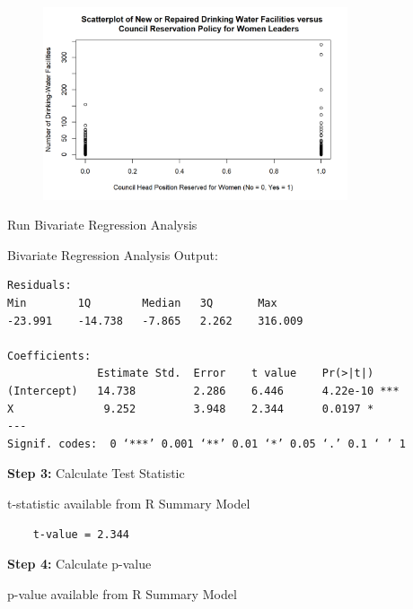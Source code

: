 \documentclass[12pt,letterpaper]{article}
\begin{document}
\begin{figure}[H]
	\centering
	\includegraphics[width=0.8\textwidth]{Figure_2_1.png}
\end{figure}

\noindent Run Bivariate Regression Analysis 


\noindent Bivariate Regression Analysis Output:
\begin{verbatim}
Residuals:
Min        1Q        Median   3Q       Max 
-23.991    -14.738   -7.865   2.262    316.009 

Coefficients:
              Estimate Std.  Error    t value    Pr(>|t|)    
(Intercept)   14.738         2.286    6.446      4.22e-10 ***
X              9.252         3.948    2.344      0.0197 *  
---
Signif. codes:  0 ‘***’ 0.001 ‘**’ 0.01 ‘*’ 0.05 ‘.’ 0.1 ‘ ’ 1
\end{verbatim}
\vspace{.5cm}
\noindent\textbf{Step 3:} Calculate Test Statistic

\noindent t-statistic available from R Summary Model

\begin{verbatim}
	t-value = 2.344
\end{verbatim}
\vspace{.5cm}
\noindent\textbf{Step 4:} Calculate p-value

\noindent p-value available from R Summary Model
\end{document}
